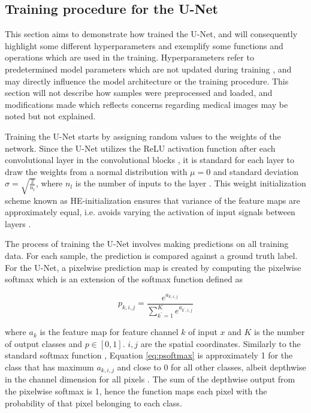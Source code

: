\documentclass[../main/thesis.tex]{subfiles}
\begin{document}
\subsection{Training procedure for the U-Net}
\label{sec:training-loop}
This section aims to demonstrate how \citet{Ronneberger2015} trained the U-Net, and will consequently highlight some different hyperparameters and exemplify some functions and operations which are used in the training. Hyperparameters refer to predetermined model parameters which are not updated during training \citep{Yu2020a}, and may directly influence the model architecture or the training procedure. This section will not describe how samples were preprocessed and loaded, and modifications made which reflects concerns regarding medical images may be noted but not explained.

Training the U-Net starts by assigning random values to the weights of the network. Since the U-Net utilizes the ReLU activation function after each convolutional layer in the convolutional blocks \citep{Ronneberger2015}, it is standard for each layer to draw the weights from a normal distribution with $\mu = 0$ and standard deviation $\sigma = \sqrt{\frac{2}{n_l}}$, where $n_l$ is the number of inputs to the layer \citep{He2015}. This weight initialization scheme known as HE-initialization ensures that variance of the feature maps are approximately equal, i.e. avoids varying the activation of input signals between layers \citep{He2015,Ronneberger2015}.

The process of training the U-Net involves making predictions on all training data. For each sample, the prediction is compared against a ground truth label. For the U-Net, a pixelwise prediction map is created by computing the pixelwise softmax which is an extension of the softmax function \citep{Bridle1990} defined as 

\begin{equation}
    \label{eq:psoftmax}
    p_{k,i,j} = \frac{e^{a_{k,i,j}}}{\sum_{k^{\prime} = 1}^Ke^{a_{k^\prime,i,j}}}
\end{equation}

where $a_k$ is the feature map for feature channel $k$ of input $x$ and $K$ is the number of output classes and $p \in \left[0, 1\right]$. $i,j$ are the spatial coordinates. Similarly to the standard softmax function \citep{Bridle1990}, Equation \ref{eq:psoftmax} is approximately 1 for the class that has maximum $a_{k,i,j}$ and close to 0 for all other classes, albeit depthwise in the channel dimension for all pixels \citep{Ronneberger2015}. The sum of the depthwise output from the pixelwise softmax is 1, hence the function maps each pixel with the probability of that pixel belonging to each class. 
\end{document}
